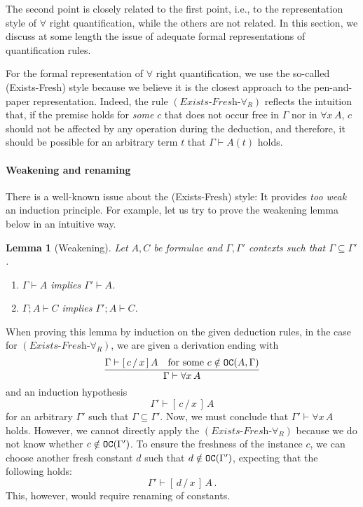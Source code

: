\documentclass{svjour3}                     %
\newtheorem{lem}[thm]{Lemma}
\newcommand{\seq}[2]{\infer{#2}{#1}}
\newcommand{\Ga}{\Gamma}
\newcommand{\vd}{\vdash}
\newcommand{\substs}[3]{[\, #3\, \slash\, #2\,]\, #1}
\newcommand{\tm}{\subseteq}
\newcommand{\scol}{\mathop{;}}
\newcommand{\tOC}{\textup{\tt OC}}
\begin{document}
The second point is closely related to the first point, i.e., to the representation style of $\forall$ right quantification, while the others are not related. In this section, we discuss at some length the issue of adequate formal representations of quantification rules.


For the formal representation of $\forall$ right quantification, we use the so-called (Exists-Fresh) style because we believe it is the closest approach to the pen-and-paper representation. Indeed, the rule $(\textit{Exists-Fresh-}\forall_R)$ reflects the intuition that, if the premise holds for {\em some} $c$ that does not occur free in $\Ga$ nor in $\forall x\, A$, $c$ should not be affected by any operation during the deduction, and therefore, it should be possible for an arbitrary term $t$ that $\Ga \vd A(t)$ holds.

\paragraph{\bf Weakening and renaming}
There is a well-known issue about the (Exists-Fresh) style: It provides \textit{too weak} an induction principle. For example, let us try to prove the weakening lemma below in an intuitive way.

\begin{lem}[Weakening]\label{weakening}
  Let $A, C$ be formulae and $\Ga, \Ga'$ contexts such that $\Ga \tm \Ga'$.
  \begin{enumerate}
  \item $\Ga \vd A$ implies $\Ga' \vd A$.
  \item $\Ga \scol A \vd C$ implies $\Ga' \scol A \vd C$.
  \end{enumerate}
\end{lem}

When proving this lemma by induction on the given deduction rules, in the case for $(\textit{Exists-Fresh-}\forall_R)$, we are given a derivation ending with
\[
\seq{\Ga \vd \substs{A}{x}{c} & \text{for some } c \notin \tOC(A, \Ga)}{\Ga\vd  \forall x\, A}
\]
and an induction hypothesis 
\begin{equation*}\label{c-fresh}
\Ga' \vd \substs{A}{x}{c}
\end{equation*}
for an arbitrary $\Ga'$ such that $\Ga \subseteq \Ga'$. Now, we must
conclude that $\Ga' \vd \forall x\, A$ holds. However, we cannot
directly apply the $(\textit{Exists-Fresh-}\forall_R)$ because we do not know whether $c \notin \tOC(\Ga')$. To ensure the freshness of the instance $c$, we can choose another fresh constant $d$ such that $d \notin \tOC(\Ga')$, expecting that the following holds:
\begin{equation}\label{d-fresh}
\Ga' \vd \substs{A}{x}{d}\,.
\end{equation}
This, however, would require renaming of constants.
\end{document}
